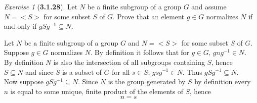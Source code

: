 \documentclass[12pt]{amsart}
\makeatletter
\theoremstyle{remark}
\newtheorem*{exercise}{Exercise}%
\renewenvironment{proof}[1][\proofname]{\par\doublespacing
  \pushQED{\qed}%
  \normalfont \topsep6\p@\@plus6\p@\relax
  \list{}{%
    \settowidth{\leftmargin}{\itshape\proofname:\hskip\labelsep}%
    \setlength{\labelwidth}{0pt}%
    \setlength{\itemindent}{-\leftmargin}%
  }%
  \item[\hskip\labelsep\itshape#1\@addpunct{:}]\ignorespaces
}{%
  \popQED\endlist\@endpefalse
  \singlespacing
}
\theoremstyle{mycomment}
\makeatother
\begin{document}
\begin{exercise}[\textbf{3.1.28}] Let $N$ be a finite subgroup of a group $G$ and assume $N = <S>$ for some subset $S$ of $G$. 
  Prove that an element $g \in G$ normalizes $N$ if and only if $gSg^{-1} \subseteq N$.
  \begin{proof} Let $N$ be a finite subgroup of a group $G$ and $N = <S>$ for some subset $S$ of $G$. Suppose $g \in G$ normalizes $N$. By definition
    it follows that for $g \in G$, $gng^{-1} \in N$. By definition $N$ is also the intersection of all subgroups containing $S$, hence $S \subseteq N$
    and since $S$ is a subset of $G$ for all $s \in S$, $gsg^{-1} \in N$. Thus $gSg^{-1} \subseteq N$. \\

    Now suppose $gSg^{-1} \subseteq N$. Since $N$ is the group generated by $S$ by definition every $n$ is equal to some unique, finite product of the 
    elements of $S$, hence
    \begin{equation*}
      n = s
    \end{equation*}
    \end{proof}
\end{exercise}
\vspace{.15in}
\end{document}
